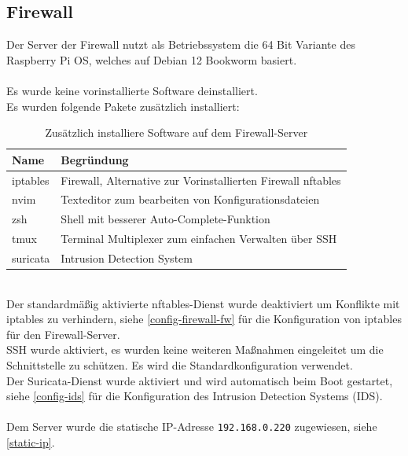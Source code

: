 \documentclass[
    a4paper,
    pagesize,
	pdftex,
    12pt,
]{scrartcl}
\begin{document}
\subsection{Firewall}
Der Server der Firewall nutzt als Betriebssystem die 64 Bit Variante des Raspberry Pi OS, welches auf Debian 12 Bookworm basiert. 
\\ \\
Es wurde keine vorinstallierte  Software deinstalliert. 
\\
Es wurden folgende Pakete zusätzlich installiert:
\begin{table}[h!]
	\begin{center}
		\label{tab:table1}
		\begin{tabular}{l|l }
			\textbf{Name} & \textbf{Begründung} \\
			\hline
			iptables & Firewall, Alternative zur Vorinstallierten Firewall nftables \\
			nvim & Texteditor zum bearbeiten von Konfigurationsdateien \\
			zsh & Shell mit besserer Auto-Complete-Funktion \\
			tmux & Terminal Multiplexer zum einfachen Verwalten über SSH \\
			suricata & Intrusion Detection System \\
		\end{tabular}
		\caption{Zusätzlich installiere Software auf dem Firewall-Server}
	\end{center}
\end{table}
\\
Der standardmäßig aktivierte nftables-Dienst wurde deaktiviert um Konflikte mit iptables zu verhindern, siehe  \ref{config-firewall-fw} für die Konfiguration von iptables für den Firewall-Server. \\
SSH wurde aktiviert, es wurden keine weiteren Maßnahmen eingeleitet um die Schnittstelle zu  schützen. Es wird die Standardkonfiguration verwendet. \\
Der Suricata-Dienst wurde aktiviert und wird automatisch beim Boot gestartet, siehe  \ref{config-ids} für die Konfiguration des Intrusion Detection Systems (IDS). \\ \\
Dem Server wurde die statische IP-Adresse \lstinline[breaklines]|192.168.0.220| zugewiesen, siehe  \ref{static-ip}.

\newpage
\end{document}
